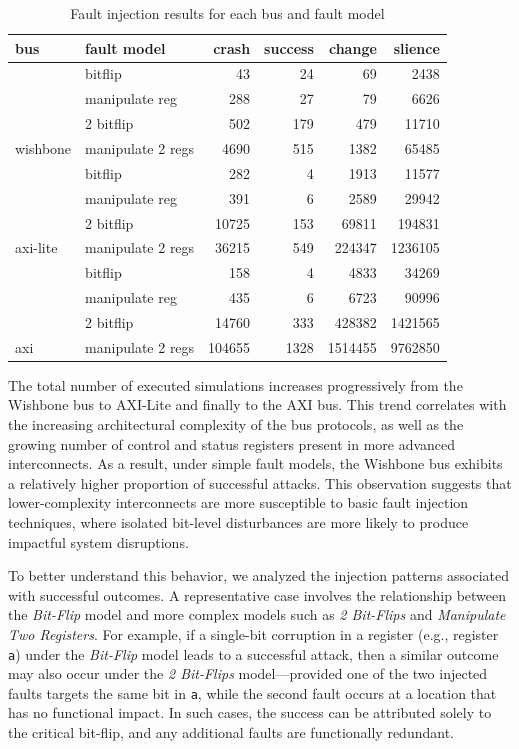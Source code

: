 \begin{table}
\centering
\caption{Fault injection results for each bus and fault model}
\label{Vunerabilities on 3 buses}
\begin{tabular}{llrrrr}
\toprule
bus & fault model & crash & success & change & slience \\
\midrule
& bitflip & 43 & 24 & 69 & 2438 \\
& manipulate reg   & 288 & 27 & 79 & 6626 \\
& 2 bitflip & 502 & 179 & 479 & 11710 \\
\multirow{-4}{*}{wishbone}  & manipulate 2 regs & 4690 & 515 & 1382 & 65485 \\
\midrule
& bitflip & 282 & 4 & 1913 & 11577 \\
& manipulate reg & 391 & 6 & 2589 & 29942 \\
& 2 bitflip & 10725 & 153 & 69811 & 194831 \\
\multirow{-4}{*}{axi-lite}  & manipulate 2 regs & 36215 & 549 & 224347 & 1236105 \\
\midrule
& bitflip & 158 & 4 & 4833 & 34269 \\
& manipulate reg   & 435 & 6 & 6723 & 90996 \\
& 2 bitflip & 14760 & 333 & 428382 & 1421565 \\
\multirow{-4}{*}{axi} & manipulate 2 regs & 104655 & 1328 & 1514455 & 9762850 \\         
\bottomrule  
\end{tabular}
\end{table}

The total number of executed simulations increases progressively from the Wishbone bus to AXI-Lite and finally to the AXI bus. This trend correlates with the increasing architectural complexity of the bus protocols, as well as the growing number of control and status registers present in more advanced interconnects. As a result, under simple fault models, the Wishbone bus exhibits a relatively higher proportion of successful attacks. This observation suggests that lower-complexity interconnects are more susceptible to basic fault injection techniques, where isolated bit-level disturbances are more likely to produce impactful system disruptions.

To better understand this behavior, we analyzed the injection patterns associated with successful outcomes. A representative case involves the relationship between the \textit{Bit-Flip} model and more complex models such as \textit{2 Bit-Flips} and \textit{Manipulate Two Registers}. For example, if a single-bit corruption in a register (e.g., register \texttt{a}) under the \textit{Bit-Flip} model leads to a successful attack, then a similar outcome may also occur under the \textit{2 Bit-Flips} model—provided one of the two injected faults targets the same bit in \texttt{a}, while the second fault occurs at a location that has no functional impact. In such cases, the success can be attributed solely to the critical bit-flip, and any additional faults are functionally redundant.

